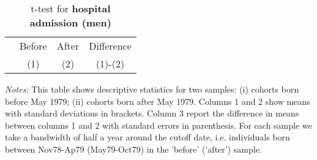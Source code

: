 \begin{table}[H] \centering 
	\begin{threeparttable} \centering \caption{t-test for \textbf{hospital admission (men)}}\label{tab:t-test_d5male}
		\begin{footnotesize}
			{\def\sym#1{\ifmmode^{#1}\else\(^{#1}\)\fi} 
				\begin{tabular}{l*{3}{c}}
					\toprule 
					& \multicolumn{1}{c}{Before} & \multicolumn{1}{c}{After} & \multicolumn{1}{c}{Difference} \\
					&\multicolumn{1}{c}{(1)}&\multicolumn{1}{c}{(2)}&\multicolumn{1}{c}{(1)-(2)}\\
					\midrule
					
					\bottomrule
			\end{tabular}}
		\end{footnotesize}
	\end{threeparttable} 
	\begin{minipage}{0.9\linewidth}
		\scriptsize \emph{Notes:} This table shows descriptive statistics for two samples: (i) cohorts born before May 1979; (ii) cohorts born after May 1979. Columns 1 and 2 show means with standard deviations in brackets. Column 3 report the difference in means between columns 1 and 2 with standard errors in parenthesis. For each sample we take a bandwidth of half a year around the cutoff date, i.e. individuals born between Nov78-Ap79 (May79-Oct79) in the 'before' ('after') sample.
	\end{minipage}
\end{table} 




